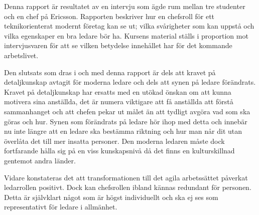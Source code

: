 
Denna rapport är resultatet av en intervju som ägde rum mellan tre studenter och en chef på Ericsson. Rapporten beskriver hur en chefsroll för ett teknikorienterat modernt företag kan se ut; vilka svårigheter som kan uppstå och vilka egenskaper en bra ledare bör ha. Kursens material ställs i proportion mot intervjusvaren för att se vilken betydelse innehållet har för det kommande arbetslivet.

Den slutsats som dras i och med denna rapport är dels att kravet på detaljkunskap avtagit för moderna ledare och dels att synen på ledare förändrats. Kravet på detaljkunskap har ersatts med en utökad önskan om att kunna motivera sina anställda, det är numera viktigare att få anställda att förstå sammanhanget och att chefen pekar ut målet än att tydligt avgöra vad som ska göras och hur. Synen som förändrats på ledare hör ihop med detta och innebär nu inte längre att en ledare ska bestämma riktning och hur man når dit utan överlåta det till mer insatta personer. Den moderna ledaren måste dock fortfarande hålla sig på en viss kunskapsnivå då det finns en kulturskillnad gentemot andra länder.

Vidare konstateras det att transformationen till det agila arbetssättet påverkat ledarrollen positivt. Dock kan chefsrollen ibland kännas redundant för personen. Detta är självklart något som är högst individuellt och ska ej ses som representativt för ledare i allmänhet.